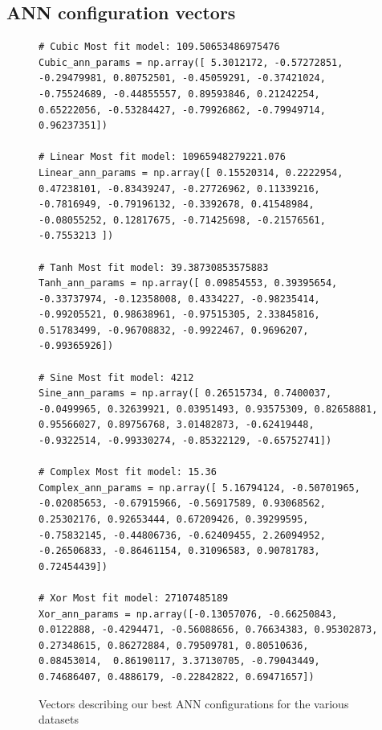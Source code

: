 \documentclass[12pt]{article}
\begin{document}
\newpage
\subsection{ANN configuration vectors}\label{app:ANNconf}
\begin{figure}[h]
    \begin{verbatim}
# Cubic Most fit model: 109.50653486975476
Cubic_ann_params = np.array([ 5.3012172, -0.57272851, -0.29479981, 0.80752501, -0.45059291, -0.37421024, -0.75524689, -0.44855557, 0.89593846, 0.21242254, 0.65222056, -0.53284427, -0.79926862, -0.79949714, 0.96237351])

# Linear Most fit model: 10965948279221.076
Linear_ann_params = np.array([ 0.15520314, 0.2222954, 0.47238101, -0.83439247, -0.27726962, 0.11339216, -0.7816949, -0.79196132, -0.3392678, 0.41548984, -0.08055252, 0.12817675, -0.71425698, -0.21576561, -0.7553213 ])

# Tanh Most fit model: 39.38730853575883
Tanh_ann_params = np.array([ 0.09854553, 0.39395654, -0.33737974, -0.12358008, 0.4334227, -0.98235414, -0.99205521, 0.98638961, -0.97515305, 2.33845816, 0.51783499, -0.96708832, -0.9922467, 0.9696207, -0.99365926])

# Sine Most fit model: 4212
Sine_ann_params = np.array([ 0.26515734, 0.7400037, -0.0499965, 0.32639921, 0.03951493, 0.93575309, 0.82658881, 0.95566027, 0.89756768, 3.01482873, -0.62419448, -0.9322514, -0.99330274, -0.85322129, -0.65752741])

# Complex Most fit model: 15.36
Complex_ann_params = np.array([ 5.16794124, -0.50701965, -0.02085653, -0.67915966, -0.56917589, 0.93068562, 0.25302176, 0.92653444, 0.67209426, 0.39299595, -0.75832145, -0.44806736, -0.62409455, 2.26094952, -0.26506833, -0.86461154, 0.31096583, 0.90781783, 0.72454439])

# Xor Most fit model: 27107485189
Xor_ann_params = np.array([-0.13057076, -0.66250843, 0.0122888, -0.4294471, -0.56088656, 0.76634383, 0.95302873, 0.27348615, 0.86272884, 0.79509781, 0.80510636,  0.08453014,  0.86190117, 3.37130705, -0.79043449, 0.74686407, 0.4886179, -0.22842822, 0.69471657])

    \end{verbatim}
    \caption{Vectors describing our best ANN configurations for the various datasets}
    \label{minted:annVec}
\end{figure}
\end{document}
